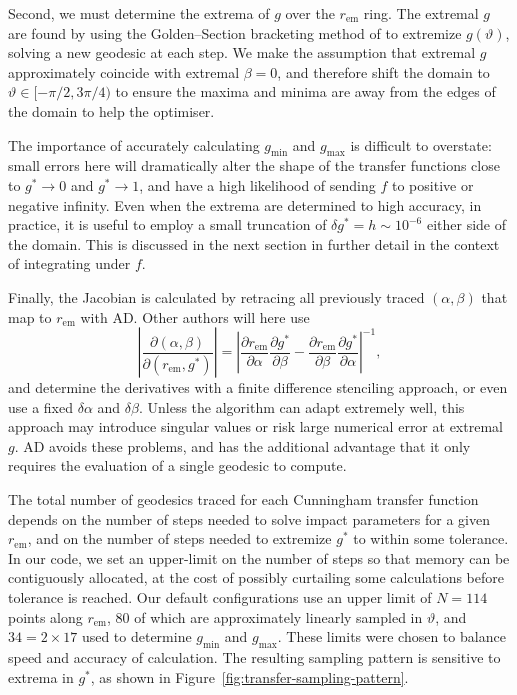 \documentclass[fleqn,usenatbib]{mnras}
\newcommand{\pderiv}[2]{\frac{\partial #1}{\partial #2}}
\newcommand{\rhoem}{r_\text{em}}
\begin{document}
Second, we must determine the extrema of $g$ over the $\rhoem$ ring. The
extremal $g$ are found by using the Golden--Section bracketing method of
\cite{Optim.jl-2018} to extremize $g(\vartheta)$, solving a new geodesic at each
step. We make the assumption that extremal $g$ approximately coincide with
extremal $\beta = 0$, and therefore shift the domain to $\vartheta \in [ -\pi/2,
3\pi/4)$ to ensure the maxima and minima are away from the edges of the domain
to help the optimiser.

The importance of accurately calculating $g_\text{min}$ and $g_\text{max}$ is
difficult to overstate: small errors here will dramatically alter the shape of
the transfer functions close to $g^\ast \rightarrow 0$ and $g^\ast \rightarrow
1$, and have a high likelihood of sending $f$ to positive or negative infinity.
Even when the extrema are determined to high accuracy, in practice, it is useful
to employ a small truncation of $\delta g^\ast = h \sim 10^{-6}$ either side of
the domain. This is discussed in the next section in further detail in the
context of integrating under $f$.

Finally, the Jacobian is calculated by retracing all previously traced $(\alpha,
\beta)$ that map to $\rhoem$ with AD. Other authors will here use
\begin{equation}
    \left\lvert
    \pderiv{(\alpha, \beta)}{(\rhoem, g^\ast)}
    \right\rvert
    =
    \left\lvert
    \pderiv{\rhoem}{\alpha}\pderiv{g^\ast}{\beta}
    -
    \pderiv{\rhoem}{\beta}\pderiv{g^\ast}{\alpha}
    \right\rvert^{-1},
\end{equation}
and determine the derivatives with a finite difference stenciling approach, or
even use a fixed $\delta \alpha$ and $\delta \beta$. Unless the algorithm can
adapt extremely well, this approach may introduce singular values or risk large
numerical error at extremal $g$. AD avoids these problems, and has the
additional advantage that it only requires the evaluation of a single geodesic
to compute.

The total number of geodesics traced for each Cunningham transfer function
depends on the number of steps needed to solve impact parameters for a given
$\rhoem$, and on the number of steps needed to extremize $g^\ast$ to within
some tolerance. In our code, we set an upper-limit on the number of steps so
that memory can be contiguously allocated, at the cost of possibly curtailing
some calculations before tolerance is reached. Our default configurations use an
upper limit of $N = 114$ points along $\rhoem$, $80$ of which are
approximately linearly sampled in $\vartheta$, and $34 = 2 \times 17$ used to
determine $g_\text{min}$ and $g_\text{max}$. These limits were chosen to balance
speed and accuracy of calculation. The resulting sampling pattern is sensitive
to extrema in $g^\ast$, as shown in Figure~\ref{fig:transfer-sampling-pattern}.
\end{document}
